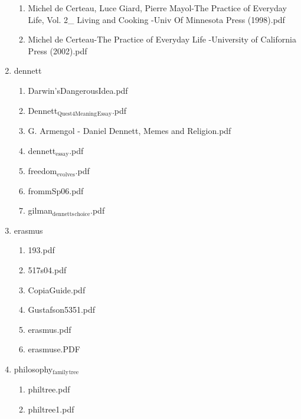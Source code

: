\documentclass[11pt]{article}
\begin{document}
\begin{enumerate}
\begin{enumerate}
\item Michel de Certeau, Luce Giard, Pierre Mayol-The Practice of Everyday Life, Vol. 2\_ Living and Cooking  -Univ Of Minnesota Press (1998).pdf
\label{sec-1-1-1-1-34-47-4}

\item Michel de Certeau-The Practice of Everyday Life  -University of California Press (2002).pdf
\label{sec-1-1-1-1-34-47-5}
\end{enumerate}

\item dennett
\label{sec-1-1-1-1-34-48}
\begin{enumerate}
\item Darwin'sDangerousIdea.pdf
\label{sec-1-1-1-1-34-48-1}

\item Dennett$_{\text{Quest4Meaning}}$$_{\text{Essay}}$.pdf
\label{sec-1-1-1-1-34-48-2}

\item G. Armengol - Daniel Dennett, Memes and Religion.pdf
\label{sec-1-1-1-1-34-48-3}

\item dennett$_{\text{essay}}$.pdf
\label{sec-1-1-1-1-34-48-4}

\item freedom$_{\text{evolves}}$.pdf
\label{sec-1-1-1-1-34-48-5}

\item frommSp06.pdf
\label{sec-1-1-1-1-34-48-6}

\item gilman$_{\text{dennetts}}$$_{\text{choice}}$.pdf
\label{sec-1-1-1-1-34-48-7}
\end{enumerate}

\item erasmus
\label{sec-1-1-1-1-34-49}
\begin{enumerate}
\item 193.pdf
\label{sec-1-1-1-1-34-49-1}

\item 517s04.pdf
\label{sec-1-1-1-1-34-49-2}

\item CopiaGuide.pdf
\label{sec-1-1-1-1-34-49-3}

\item Gustafson5351.pdf
\label{sec-1-1-1-1-34-49-4}

\item erasmus.pdf
\label{sec-1-1-1-1-34-49-5}

\item erasmuse.PDF
\label{sec-1-1-1-1-34-49-6}
\end{enumerate}

\item philosophy$_{\text{family}}$$_{\text{tree}}$
\label{sec-1-1-1-1-34-50}
\begin{enumerate}
\item philtree.pdf
\label{sec-1-1-1-1-34-50-1}

\item philtree1.pdf
\label{sec-1-1-1-1-34-50-2}
\end{enumerate}
\end{enumerate}
\end{document}

